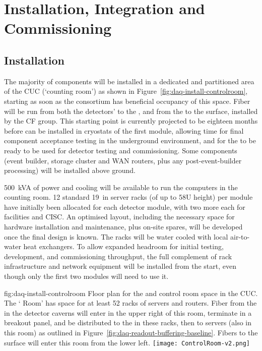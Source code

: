 
\section{Installation, Integration and Commissioning}
\label{sec:fdsp-daq-install}

\subsection{Installation}
\label{sec:fdsp-daq-install-transport}

The majority of  components will be installed in a dedicated and partitioned area of the CUC (`counting room') as shown in Figure~\ref{fig:daq-install-controlroom}, starting as soon as the consortium has beneficial occupancy of this space. Fiber will be run from both the detectors'  to the , and from the  to the surface, installed by the CF group. This starting point is currently projected to be eighteen months before  can be installed in cryostats of the first module, allowing time for final component acceptance testing in the underground environment, and for the  to be ready to be used for detector testing and commissioning. Some  components (event builder, storage cluster and WAN routers, plus any post-event-builder processing) will be installed above ground.

\SI{500}{kVA} of power and cooling will be available to run the computers in the counting room. 12 standard \SI{19}{in} server racks (of up to 58U height) per module have initially been allocated for each detector module, with two more each for facilities and CISC. An optimised layout, including the necessary space for hardware installation and maintenance, plus on-site spares, will be developed once the final  design is known. The racks will be water cooled with local air-to-water heat exchangers. To allow expanded headroom for initial testing, development, and commissioning throughput, the full complement of rack infrastructure and network equipment will be installed from the start, even though only the first two modules will need to use it.

\begin{dunefigure}{fig:daq-install-controlroom}
  {Floor plan for the  and control room space in the CUC.  The `
    Room' has space for at least 52 racks of servers and routers.
    Fiber from the  in the detector caverns will enter in the upper
    right of this room, terminate in a breakout panel, and be
    distributed to the  in these racks, then to  servers (also
    in this room) as outlined in
    Figure~\ref{fig:daq-readout-buffering-baseline}.  Fibers to the
    surface will enter this room from the lower left.}
\texttt{[image: ControlRoom-v2.png]}
\end{dunefigure}

